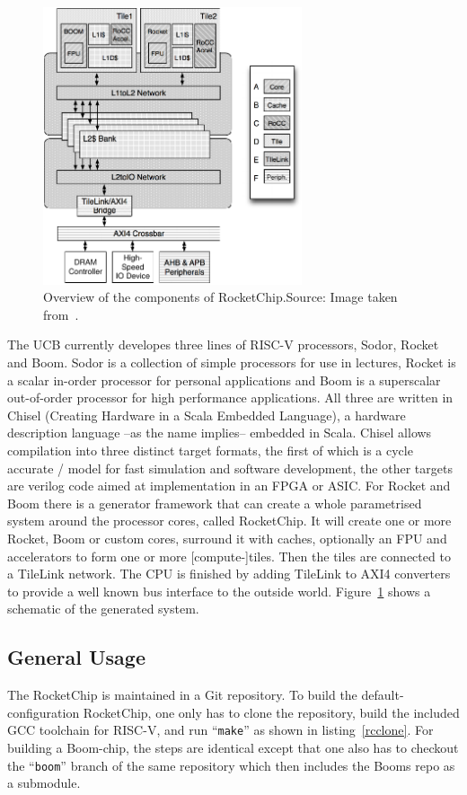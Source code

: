 \documentclass[journal,a4paper]{IEEEtran}
\newcommand{\source}[1]{Source: #1}
\begin{document}
\begin{figure}[!t]
	\centering
	\includegraphics[width=3in]{rcov}
	\caption{Overview of the components of RocketChip.\newline\hspace{\linewidth}\source{Image taken from~\cite{rcgen}}.}
	\label{rcov}
\end{figure}
The UCB currently developes three lines of RISC-V processors, Sodor, Rocket and Boom.
Sodor is a collection of simple processors for use in lectures, Rocket is a scalar in-order processor for personal applications and Boom is a superscalar out-of-order processor for high performance applications.
All three are written in Chisel (Creating Hardware in a Scala Embedded Language), a hardware description language --as the name implies-- embedded in Scala.
Chisel allows compilation into three distinct target formats, the first of which is a cycle accurate \CC/ model for fast simulation and software development, the other targets are verilog code aimed at implementation in an FPGA or ASIC\@.
For Rocket and Boom there is a generator framework that can create a whole parametrised system around the processor cores, called RocketChip.
It will create one or more Rocket, Boom or custom cores, surround it with caches, optionally an FPU and accelerators to form one or more [compute-]tiles. Then the tiles are connected to a TileLink network. The CPU is finished by adding TileLink to AXI4 converters to provide a well known bus interface to the outside world. Figure~\ref{rcov} shows a schematic of the generated system.


\subsection{General Usage}
The RocketChip is maintained in a Git repository.
To build the default-configuration RocketChip, one only has to clone the repository, build the included GCC toolchain for RISC-V, and run ``\texttt{make}'' as shown in listing~\ref{rcclone}. For building a Boom-chip, the steps are identical except that one also has to checkout the ``\texttt{boom}'' branch of the same repository which then includes the Booms repo as a submodule.
\end{document}
